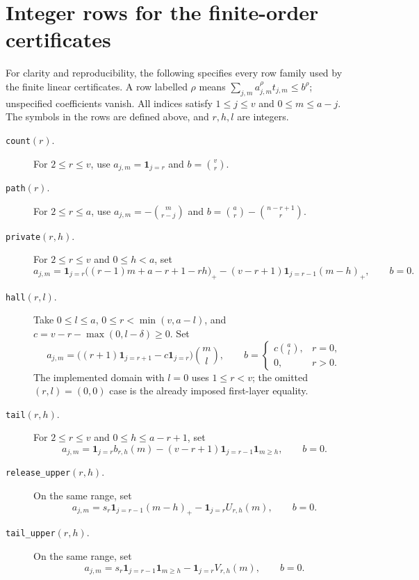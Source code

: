 \section{Integer rows for the finite-order certificates}
\label{f60:subsec-row-specification}

For clarity and reproducibility, the following specifies every row
family used by the finite linear certificates.  A row labelled $\rho$
means $\sum_{j,m}a^\rho_{j,m}t_{j,m}\le b^\rho$; unspecified
coefficients vanish.  All indices satisfy $1\le j\le v$ and
$0\le m\le a-j$.  The symbols in the rows are defined above, and
$r,h,l$ are integers.

\begin{description}
\item[\texttt{count}$(r)$.]
For $2\le r\le v$, use
$a_{j,m}=\mathbf{1}_{j=r}$ and $b=\binom vr$.

\item[\texttt{path}$(r)$.]
For $2\le r\le a$, use
$a_{j,m}=-\binom m{r-j}$ and
$b=\binom ar-\binom{n-r+1}{r}$.

\item[\texttt{private}$(r,h)$.]
For $2\le r\le v$ and $0\le h<a$, set
\[
 a_{j,m}=\mathbf{1}_{j=r}\bigl((r-1)m+a-r+1-rh\bigr)_+
 -(v-r+1)\mathbf{1}_{j=r-1}(m-h)_+,
 \qquad b=0.
\]

\item[\texttt{hall}$(r,l)$.]
Take $0\le l\le a$, $0\le r<\min(v,a-l)$, and
$c=v-r-\max(0,l-\delta)\ge0$.  Set
\[
 a_{j,m}=\bigl((r+1)\mathbf{1}_{j=r+1}-c\mathbf{1}_{j=r}\bigr)
                 \binom ml,\qquad
 b=\begin{cases}c\binom al,&r=0,\\0,&r>0.\end{cases}
\]
The implemented domain with $l=0$ uses $1\le r<v$; the omitted
$(r,l)=(0,0)$ case is the already imposed first-layer equality.

\item[\texttt{tail}$(r,h)$.]
For $2\le r\le v$ and $0\le h\le a-r+1$, set
\[
 a_{j,m}=\mathbf{1}_{j=r}b_{r,h}(m)
 -(v-r+1)\mathbf{1}_{j=r-1}\mathbf{1}_{m\ge h},\qquad b=0.
\]

\item[\texttt{release\_upper}$(r,h)$.]
On the same range, set
\[
 a_{j,m}=s_r\mathbf{1}_{j=r-1}(m-h)_+
            -\mathbf{1}_{j=r}U_{r,h}(m),\qquad b=0.
\]

\item[\texttt{tail\_upper}$(r,h)$.]
On the same range, set
\[
 a_{j,m}=s_r\mathbf{1}_{j=r-1}\mathbf{1}_{m\ge h}
            -\mathbf{1}_{j=r}V_{r,h}(m),\qquad b=0.
\]


\end{description}
